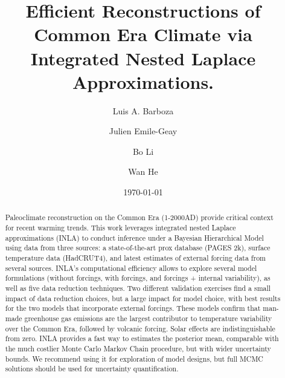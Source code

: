 \documentclass[12pt]{amsart}
\theoremstyle{plain}
\theoremstyle{definition}
\theoremstyle{remark}
\begin{document}
\doublespacing
\title[]{Efficient Reconstructions of Common Era Climate via Integrated Nested Laplace Approximations.}

\author[]{Luis A. Barboza}
\address{Centro de Investigacion en Matematica Pura y Aplicada (CIMPA)-Escuela
  de Matematica, Universidad de Costa Rica\\
San Jos\'e, Costa Rica}


\author[]{Julien Emile-Geay}
\address{Department of Earth Sciences \\
  University of Southern California \\
  Los Angeles, California, USA.
}


\author[]{Bo Li}
\address{Department of Statistics \\
  University of Illinois at Urbana-Champaign \\
  Champaign, Illinois, USA.
}

\author[]{Wan He}

\date{\today}
\subjclass[2010]{}
\maketitle

\begin{abstract}
Paleoclimate reconstruction on the Common Era (1-2000AD) provide critical context for recent warming trends. This work leverages integrated nested Laplace approximations (INLA) to conduct inference under a Bayesian Hierarchical Model using data from three sources: a state-of-the-art prox database (PAGES 2k), surface temperature data (HadCRUT4), and latest estimates of external forcing data from several sources. 
INLA's computational efficiency allows to explore several model formulations (without forcings, with forcings, and forcings + internal variability), as well as five data reduction techniques.  Two different validation exercises find a small impact of data reduction choices, but a large impact for model choice, with best results for the two models that incorporate external forcings. These models confirm that man-made greenhouse gas emissions are the largest contributor to temperature variability over the Common Era, followed by volcanic forcing. Solar effects are indistinguishable from zero.  INLA provides a fast way to estimates the posterior mean, comparable with the much costlier Monte Carlo Markov Chain procedure, but with wider uncertainty bounds. We recommend using it for exploration of model designs, but full MCMC solutions should be used for uncertainty quantification.  
\end{abstract}
\end{document}
